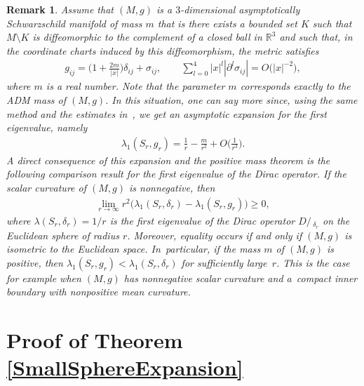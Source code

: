 \documentclass[pdftex]{sigma}
\numberwithin{equation}{section}
\newtheorem{Remark}[Theorem]{Remark}
\def\D{D\!\!\!\!/\,}
\begin{document}
\begin{Remark}
Assume that $(M,g)$ is a $3$-dimensional asymptotically Schwarzschild manifold of mass $m$ that is there exists a bounded set $K$ such that $M\setminus K$ is diffeomorphic to the complement of a closed ball in $\mathbb{R}^3$ and such that, in the coordinate charts induced by this diffeomorphism, the metric satisfies
\begin{gather*}
g_{ij}=\bigg(1+\frac{2m}{|x|}\bigg)\delta_{ij}+\sigma_{ij},\qquad \sum_{l=0}^4|x|^{l}|\partial^l\sigma_{ij}|=O\big(|x|^{-2}\big),
\end{gather*}
where $m$ is a real number. Note that the parameter $m$ corresponds exactly to the ADM mass of $(M,g)$. In this situation, one can say more since, using the same method and the estimates in~\cite[Section 5]{ShiTam1}, we get an asymptotic expansion for the first eigenvalue, namely
\begin{gather*}%
\lambda_1(S_r,g_r)=\frac{1}{r}-\frac{m}{r^2}+O\bigg(\frac{1}{r^3}\bigg).
\end{gather*}
A direct consequence of this expansion and the positive mass theorem is the following comparison result for the first eigenvalue of the Dirac operator. If the scalar curvature of $(M,g)$ is nonnegative, then
\begin{gather*}
\lim_{r\rightarrow\infty} r^2\big(\lambda_1(S_r,\delta_r)-\lambda_1(S_r,g_r)\big)\geq 0,
\end{gather*}
where $\lambda(S_r,\delta_r)=1/r$ is the first eigenvalue of the Dirac operator $\D_{\delta_r}$ on the Euclidean sphere of radius $r$. Moreover, equality occurs if and only if $(M,g)$ is isometric to the Euclidean space. In~particular, if the mass $m$ of $(M,g)$ is positive, then $\lambda_1(S_r,g_r)<\lambda_1(S_r,\delta_r)$ for sufficiently large~$r$. This is the case for example when $(M,g)$ has nonnegative scalar curvature and a~compact inner boundary with nonpositive mean curvature.
\end{Remark}

\section{Proof of Theorem \ref{SmallSphereExpansion}}\label{SmallSphereLimit}
\end{document}
